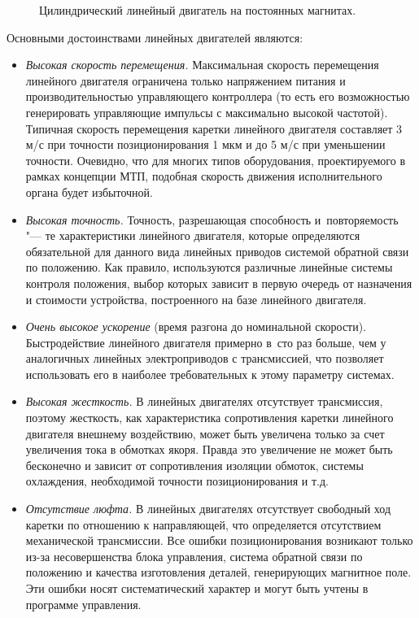 \begin{figure}[ht]
	\caption{Цилиндрический линейный двигатель на постоянных магнитах.}\label{fig:lindrive}
\end{figure}

Основными достоинствами линейных двигателей являются:

\begin{itemize}
	\item \textit{Высокая скорость перемещения.} Максимальная скорость перемещения линейного двигателя ограничена только напряжением питания и производительностью управляющего контроллера (то есть его возможностью генерировать управляющие импульсы с максимально высокой частотой). Типичная скорость перемещения каретки линейного двигателя составляет 3 м/с при точности позиционирования 1 мкм и до 5 м/с при уменьшении точности. Очевидно, что для многих типов оборудования, проектируемого в рамках концепции МТП, подобная скорость движения исполнительного органа будет избыточной.
	
	\item \textit{Высокая точность.} Точность, разрешающая способность и~повторяемость "--- те характеристики линейного двигателя, которые определяются обязательной для данного вида линейных приводов системой обратной связи по положению. Как правило, используются различные линейные системы контроля положения, выбор которых зависит в первую очередь от назначения и стоимости устройства, построенного на базе линейного двигателя.
	
	\item \textit{Очень высокое ускорение} (время разгона до номинальной скорости). Быстродействие линейного двигателя примерно в~сто раз больше, чем у аналогичных линейных электроприводов с трансмиссией, что позволяет использовать его в наиболее требовательных к этому параметру системах.
	
	\item \textit{Высокая жесткость.} В линейных двигателях отсутствует трансмиссия, поэтому жесткость, как характеристика сопротивления каретки линейного двигателя внешнему воздействию, может быть увеличена только за счет увеличения тока в обмотках якоря. Правда это увеличение не может быть бесконечно и зависит от сопротивления изоляции обмоток, системы охлаждения, необходимой точности позиционирования и т.\:д.
	
	\item \textit{Отсутствие люфта.} В линейных двигателях отсутствует свободный ход каретки по отношению к направляющей, что определяется отсутствием механической трансмиссии. Все ошибки позиционирования возникают только из-за несовершенства блока управления, система обратной связи по положению и качества изготовления деталей, генерирующих магнитное поле. Эти ошибки носят систематический характер и могут быть учтены в программе управления. 
\end{itemize}

